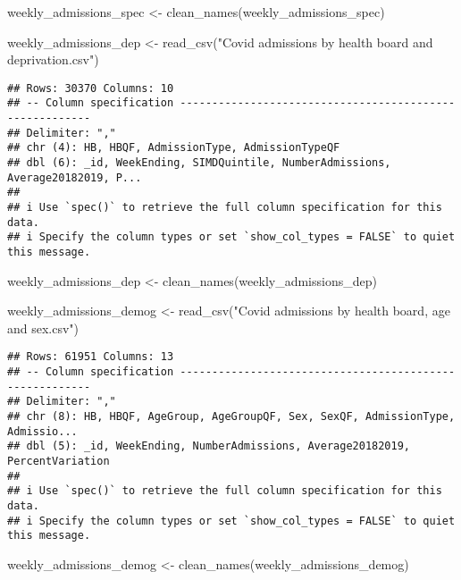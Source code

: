 \documentclass[
]{article}
\newenvironment{Shaded}{\begin{snugshade}}{\end{snugshade}}
\newcommand{\FunctionTok}[1]{\textcolor[rgb]{0.00,0.00,0.00}{#1}}
\newcommand{\NormalTok}[1]{#1}
\newcommand{\OtherTok}[1]{\textcolor[rgb]{0.56,0.35,0.01}{#1}}
\newcommand{\StringTok}[1]{\textcolor[rgb]{0.31,0.60,0.02}{#1}}
\begin{document}
\begin{Shaded}
\begin{Highlighting}[]
\NormalTok{weekly\_admissions\_spec }\OtherTok{\textless{}{-}} \FunctionTok{clean\_names}\NormalTok{(weekly\_admissions\_spec)}

\NormalTok{weekly\_admissions\_dep }\OtherTok{\textless{}{-}} \FunctionTok{read\_csv}\NormalTok{(}\StringTok{"Covid admissions by health board and deprivation.csv"}\NormalTok{)}
\end{Highlighting}
\end{Shaded}

\begin{verbatim}
## Rows: 30370 Columns: 10
## -- Column specification --------------------------------------------------------
## Delimiter: ","
## chr (4): HB, HBQF, AdmissionType, AdmissionTypeQF
## dbl (6): _id, WeekEnding, SIMDQuintile, NumberAdmissions, Average20182019, P...
## 
## i Use `spec()` to retrieve the full column specification for this data.
## i Specify the column types or set `show_col_types = FALSE` to quiet this message.
\end{verbatim}

\begin{Shaded}
\begin{Highlighting}[]
\NormalTok{weekly\_admissions\_dep }\OtherTok{\textless{}{-}} \FunctionTok{clean\_names}\NormalTok{(weekly\_admissions\_dep)}

\NormalTok{weekly\_admissions\_demog }\OtherTok{\textless{}{-}} \FunctionTok{read\_csv}\NormalTok{(}\StringTok{"Covid admissions by health board, age and sex.csv"}\NormalTok{)}
\end{Highlighting}
\end{Shaded}

\begin{verbatim}
## Rows: 61951 Columns: 13
## -- Column specification --------------------------------------------------------
## Delimiter: ","
## chr (8): HB, HBQF, AgeGroup, AgeGroupQF, Sex, SexQF, AdmissionType, Admissio...
## dbl (5): _id, WeekEnding, NumberAdmissions, Average20182019, PercentVariation
## 
## i Use `spec()` to retrieve the full column specification for this data.
## i Specify the column types or set `show_col_types = FALSE` to quiet this message.
\end{verbatim}

\begin{Shaded}
\begin{Highlighting}[]
\NormalTok{weekly\_admissions\_demog }\OtherTok{\textless{}{-}} \FunctionTok{clean\_names}\NormalTok{(weekly\_admissions\_demog)}
\end{Highlighting}
\end{Shaded}
\end{document}
